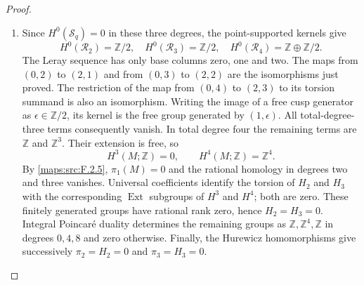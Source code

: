 \documentclass[11pt,a4paper]{article}
\theoremstyle{definition}
\begin{document}
\begin{proof}
\begin{enumerate}[label=\arabic*.]
\item Since $H^0(\mathcal S_q)=0$ in these three degrees, the
point-supported kernels give
\[
 H^0(\mathcal R_2)=\mathbb Z/2,\quad
 H^0(\mathcal R_3)=\mathbb Z/2,\quad
 H^0(\mathcal R_4)=\mathbb Z\oplus\mathbb Z/2.
\]
The Leray sequence
\cite[Tag 01F2, Lemma 20.13.4; chapter PDF p.~22]{StacksProject}
has only base columns zero, one and two.
The maps from $(0,2)$ to $(2,1)$ and from $(0,3)$ to $(2,2)$ are
the isomorphisms just proved.  The restriction of the map from
$(0,4)$ to $(2,3)$ to its torsion summand is also an isomorphism.
Writing the image of a free cusp generator as $\epsilon\in\mathbb Z/2$,
its kernel is the free group generated by $(1,\epsilon)$.
All total-degree-three terms consequently vanish.  In total degree
four the remaining terms are $\mathbb Z$ and $\mathbb Z^3$.
Their extension is free, so
\[
                   H^3(M;\mathbb Z)=0,\qquad
                   H^4(M;\mathbb Z)=\mathbb Z^4.
\]
By \cref{maps:src:F.2.5}, $\pi_1(M)=0$ and the rational homology
in degrees two and three vanishes.  Universal coefficients
\cite[Theorem 3.2, p.~195, and Corollary 3.3, p.~196]{Hatcher2002}
identify the torsion of $H_2$ and $H_3$ with the corresponding
$\operatorname{Ext}$ subgroups of $H^3$ and $H^4$; both are zero.
These finitely generated groups have rational rank zero, hence
$H_2=H_3=0$.  Integral Poincar\'e duality
\cite[Theorem 3.30, p.~241]{Hatcher2002} determines the remaining
groups as $\mathbb Z,\mathbb Z^4,\mathbb Z$ in degrees $0,4,8$ and
zero otherwise.  Finally, the Hurewicz homomorphisms
\cite[Theorem 4.32, p.~366]{Hatcher2002} give successively
$\pi_2=H_2=0$ and $\pi_3=H_3=0$.
\end{enumerate}
\end{proof}
\end{document}
